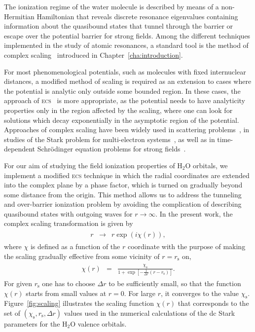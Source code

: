 The ionization regime of the water molecule is described by means of a
non-Hermitian Hamiltonian that reveals discrete resonance eigenvalues
containing information about the quasibound states that tunnel through
the barrier or escape over the potential barrier for strong
fields. Among the different techniques implemented in the study of
atomic resonances, a standard tool is the method of complex
scaling~\cite{complexScaling,complexScalingBaslev,complexScalingSimon}
introduced in Chapter~\ref{cha:introduction}.

For most phenomenological potentials, such as molecules with fixed
internuclear distances, a modified method of scaling is required as an
extension to cases where the potential is analytic only outside some
bounded region. In these cases, the approach of
\textsc{ecs}~\cite{Simon_1979} is more appropriate, as the potential
needs to have analyticity properties only in the region affected by
the scaling, where one can look for solutions which decay
exponentially in the asymptotic region of the potential. Approaches of
complex scaling have been widely used in scattering
problems~\cite{complexScalingBaslev, complexScalingSimon}, in studies
of the Stark problem for multi-electron
systems~\cite{ScrinziJChemPhys_ECS,ScrinziJPhysB_ECS}, as well as in
time-dependent Schr\"{o}dinger equation problems for strong
fields~\cite{ecsRuiz, ecsTao, ecsScrinzi}.

For our aim of studying the field ionization properties of H$_{2}$O
orbitals, we implement a modified \textsc{ecs} technique in which the
radial coordinates are extended into the complex plane by a phase
factor, which is turned on gradually beyond some distance from the
origin. This method allows us to address the tunneling and
over-barrier ionization problem by avoiding the complication of
describing quasibound states with outgoing waves for $r \to
\infty$. In the present work, the complex scaling transformation is
given by
%
\begin{eqnarray}
  \begin{split}
    r & \rightarrow & r\exp(i\chi(r)),
  \end{split}
\label{eq:ecs_r}
\end{eqnarray}
%
where $\chi$ is defined as a function of the $r$ coordinate with the
purpose of making the scaling gradually effective from some vicinity
of $r = r_{\mathrm{s}}$ on,
%
\begin{eqnarray}
  \begin{split}
    \chi(r) & = & \frac{\chi_{\mathrm{s}}}{1+\exp[-\frac{1}{\Delta r}
        (r - r_{\mathrm{s}})]}.
  \end{split}
\label{eq:ecs_theta}
\end{eqnarray} 
%
For given $r_{\mathrm{s}}$ one has to choose $\Delta r$ to be
sufficiently small, so that the function $\chi(r)$ starts from small
values at $r = 0$. For large $r$, it converges to the value
$\chi_{\mathrm{s}}$. Figure~\ref{fig:scaling} illustrates the scaling
function $\chi(r)$ that corresponds to the set of $(\chi_{\mathrm{s}},
r_{\mathrm{s}}, \Delta r)$ values used in the numerical calculations
of the dc Stark parameters for the H$_{2}$O valence orbitals.

